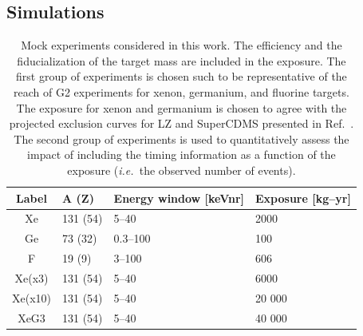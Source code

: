 \documentclass[11pt, a4paper]{article}
\newcommand{\ie}{{\it i.e.~}}  \newcommand{\eg}{{\it e.g.~}}
\begin{document}
\subsection{Simulations\label{sec:sims}}
\begin{table}[tbp]
  \setlength{\extrarowheight}{3pt}
  \setlength{\tabcolsep}{10pt}
  \begin{center}
	\begin{tabular}{|c||m{2.3cm}|m{4.2cm}|m{3.2cm}|}  \hline
	Label & A (Z) & Energy window [keVnr] & Exposure [kg--yr] \\ \hline
	\hline
	Xe & 131 (54) & 5--40 & 2000 \\  \hline
	Ge & 73 (32) & 0.3--100 & 100  \\  \hline
	F &  19 (9) & 3--100 & 606 \\  \hline
	\hline
	Xe(x3) & 131 (54) & 5--40 & 6000 \\  \hline
	Xe(x10) & 131 (54) & 5--40 & 20 000 \\  \hline
	XeG3 & 131 (54) & 5--40 & 40 000 \\ \hline \hline
	\end{tabular}
  \end{center}
\caption{Mock experiments considered in this work. The efficiency and the fiducialization of the target mass are included in the exposure. The first group of experiments is chosen such to be representative of the reach of G2 experiments for xenon, germanium, and fluorine targets. The exposure for xenon and germanium is chosen to agree with the projected exclusion curves for LZ and SuperCDMS presented in Ref.~\cite{Cushman:2013zza}. The second group of experiments is used to quantitatively assess the impact of including the timing information as a function of the exposure (\ie the observed number of events).  }
\label{tab:experiments}
\end{table}
\end{document}
